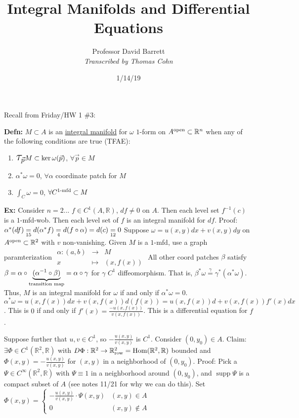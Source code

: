 \documentclass[10pt,letterpaper]{article}
\author{Professor David Barrett\\ \small\textit{Transcribed by Thomas Cohn}}
\title{Integral Manifolds and Differential Equations}
\date{1/14/19} %
\newcommand{\n}{\hfill\break}
\newcommand{\up}{\vspace{-\baselineskip}}
\newcommand{\defn}[1]{\par\noindent\settowidth{\hangindent}{\textbf{Defn: }}\textbf{Defn: }#1\n}
\newcommand{\ex}[1]{\par\noindent\settowidth{\hangindent}{\textbf{Ex: }}\textbf{Ex: }#1\n}
\newcommand{\ptxt}[1]{\textrm{\textnormal{#1}}}
\newcommand{\reals}{\mathbb{R}}
\newcommand{\R}{\reals}
\DeclareMathOperator{\Hom}{Hom}
\newcommand{\inv}{^{-1}}
\newcommand{\of}{\circ}
\newcommand{\Tau}{\mathlarger{\mathlarger{\mathlarger{\mathlarger{\tau}}}}}
\DeclareMathOperator{\supp}{supp}
\begin{document}
\maketitle
\setlength\RaggedRightParindent{\parindent}
\RaggedRight

\par\noindent Recall from Friday/HW 1 \#3:

\defn{$M\subset{}A$ is an \underline{integral manifold} for $\omega$ $1$-form on $A^{\ptxt{open}}\subset\R^{n}$ when any of the following conditions are true (TFAE):
\begin{enumerate}[label=(\alph*), leftmargin=4\parindent]
	\item $\Tau_{\vec{p}}M\subset\ker\omega(\vec{p})$, $\forall\vec{p}\in{}M$
	\item $\alpha^{*}\omega=0$, $\forall\alpha$ coordinate patch for $M$
	\item $\int_{C}\omega=0$, $\forall{}C^{\ptxt{$1$-mfd}}\subset{}M$
\end{enumerate}\up}

\ex{Consider $n=2$...\n
$f\in{}C^{1}(A,\R)$, $df\ne{}0$ on $A$.\n
Then each level set $f\inv(c)$ is a $1$-mfd-wob.\n
Then each level set of $f$ is an integral manifold for $df$.\n
Proof: $\alpha^{*}(df)\underset{\ptxt{15}}{=}d(\alpha^{*}f)\underset{\ptxt{4}}{=}d(f\of\alpha)=d(c)\underset{\ptxt{12}}=0$\n
\n
Suppose $\omega=u(x,y)dx+v(x,y)dy$ on $A^{\ptxt{open}}\subset\R^{2}$ with $v$ non-vanishing.\n
Given $M$ is a $1$-mfd, use a graph paramterization $\begin{array}{rcl}\alpha:(a,b) & \!\!\!\!\to & \!\!\!\!M\\ x & \!\!\!\!\mapsto & \!\!\!\!(x,f(x))\end{array}$\n
\n
All other coord patches $\beta$ satisfy $\beta=\alpha\of\underbrace{(\alpha\inv\of\beta)}_{\ptxt{transition map}}=\alpha\of\gamma$ for $\gamma$ $C^{1}$ diffeomorphism.\n
That is, $\beta^{*}\omega\overset{\gamma}{=}\gamma^{*}(\alpha^{*}\omega)$.\n
\n
Thus, $M$ is an integral manifold for $\omega$ if and only if $\alpha^{*}\omega=0$.\n
$\alpha^{*}\omega=u(x,f(x))dx+v(x,f(x))d(f(x))=u(x,f(x))d+v(x,f(x))f'(x)dx$.\n
This is $0$ if and only if $f'(x)=\frac{-u(x,f(x))}{v(x,f(x))}$. This is a differential equation for $f$.}

\par\noindent Suppose further that $u,v\in{}C^{1}$, so $-\frac{u(x,y)}{v(x,y)}$ is $C^{1}$. Consider $(0,y_{0})\in{}A$.\n
Claim: $\exists\Phi\in{}C^{1}(\R^{2},\R)$ with $D\Phi:\R^{2}\to\R^{2}_{\ptxt{row}}=\Hom(\R^{2},\R)$ bounded and $\Phi(x,y)=-\frac{u(x,y)}{v(x,y)}$ for $(x,y)$ in a neighborhood of $(0,y_{0})$.\n
Proof: Pick a $\Psi\in{}C^{\infty}(\R^{2},\R)$ with $\Psi\equiv{}1$ in a neighborhood around $(0,y_{0})$, and $\supp\Psi$ is a compact subset of $A$ (see notes 11/21 for why we can do this).\n
Set $\Phi(x,y)=\left\{\begin{array}{ll}-\frac{u(x,y)}{v(x,y)}\cdot\Psi(x,y) & (x,y)\in{}A\\ 0 & (x,y)\not\in{}A\end{array}\right.$\n
\end{document}
